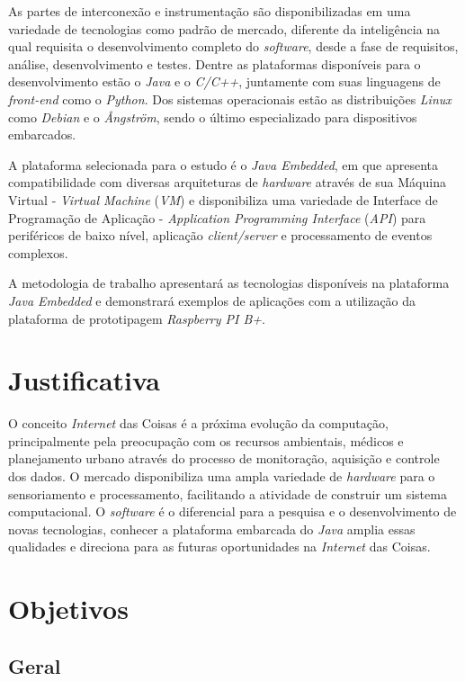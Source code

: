 As partes de interconexão e instrumentação são disponibilizadas em uma 
variedade de tecnologias como padrão de mercado, diferente da inteligência na qual requisita o desenvolvimento completo do \textit{software}, desde a fase de requisitos, análise, desenvolvimento e testes. Dentre as plataformas disponíveis para o desenvolvimento estão o \textit{Java} e o \textit{C/C++}, juntamente com suas linguagens de \textit{front-end} como o \textit{Python}. 
Dos sistemas operacionais estão as distribuições \textit{Linux} como 
\textit{Debian} e o \textit{Ångström}, sendo o último especializado para dispositivos embarcados.

A plataforma selecionada para o estudo é o \textit{Java Embedded}, em que apresenta compatibilidade com diversas arquiteturas de \textit{hardware} através de sua Máquina Virtual - \textit{Virtual Machine} (\textit{VM}) e disponibiliza uma variedade de Interface de Programação de Aplicação - \textit{Application Programming Interface} (\textit{API}) para periféricos de baixo nível, aplicação \textit{client/server} e processamento de eventos complexos.

A metodologia de trabalho apresentará as tecnologias disponíveis na plataforma \textit{Java Embedded} e demonstrará exemplos de aplicações com a utilização da plataforma de prototipagem \textit{Raspberry PI B+}.

\section{Justificativa}

O conceito \textit{Internet} das Coisas é a próxima evolução da computação, principalmente pela preocupação com os recursos ambientais, médicos e planejamento urbano através do processo de monitoração, aquisição e controle dos dados. O mercado disponibiliza uma ampla variedade de \textit{hardware} para o sensoriamento e processamento, facilitando a atividade de construir um sistema computacional. O \textit{software} é o diferencial para a pesquisa e o desenvolvimento de novas tecnologias, conhecer a plataforma embarcada do \textit{Java} amplia essas qualidades e direciona para as futuras oportunidades na \textit{Internet} das Coisas.

\section{Objetivos}

\subsection{Geral}

